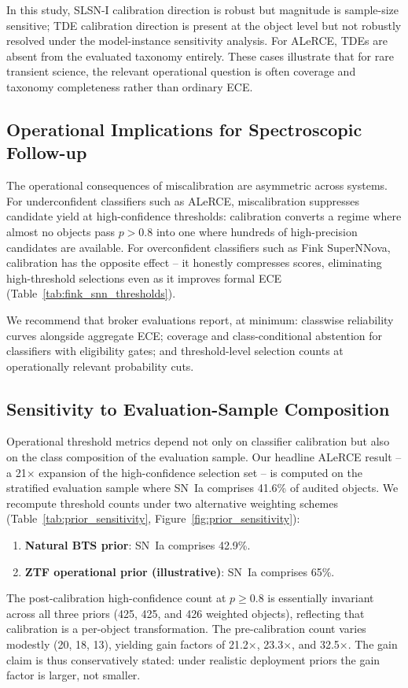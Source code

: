 \documentclass[a4paper,fleqn,usenatbib]{mnras}
\begin{document}
In this study, SLSN-I calibration direction is robust but
magnitude is sample-size sensitive; TDE calibration direction is
present at the object level but not robustly resolved under the
model-instance sensitivity analysis. For ALeRCE, TDEs are absent
from the evaluated taxonomy entirely. These cases illustrate that
for rare transient science, the relevant operational question is
often coverage and taxonomy completeness rather than ordinary ECE.

\subsection{Operational Implications for Spectroscopic
Follow-up}\label{sec:disc_operational}

The operational consequences of miscalibration are asymmetric
across systems. For underconfident classifiers such as ALeRCE,
miscalibration suppresses candidate yield at high-confidence
thresholds: calibration converts a regime where almost no objects
pass $p > 0.8$ into one where hundreds of high-precision candidates
are available. For overconfident classifiers such as Fink
SuperNNova, calibration has the opposite effect -- it honestly
compresses scores, eliminating high-threshold selections even as
it improves formal ECE (Table~\ref{tab:fink_snn_thresholds}).

We recommend that broker evaluations report, at minimum:
classwise reliability curves alongside aggregate ECE; coverage
and class-conditional abstention for classifiers with eligibility
gates; and threshold-level selection counts at operationally
relevant probability cuts.

\subsection{Sensitivity to Evaluation-Sample Composition}
\label{sec:prior_sensitivity}

Operational threshold metrics depend not only on classifier
calibration but also on the class composition of the evaluation
sample. Our headline ALeRCE result -- a 21$\times$ expansion of
the high-confidence selection set -- is computed on the stratified
evaluation sample where SN~Ia comprises 41.6\% of audited objects.
We recompute threshold counts under two alternative weighting
schemes (Table~\ref{tab:prior_sensitivity},
Figure~\ref{fig:prior_sensitivity}):
\begin{enumerate}
\item \textbf{Natural BTS prior}: SN~Ia comprises 42.9\%.
\item \textbf{ZTF operational prior (illustrative)}: SN~Ia
comprises 65\%.
\end{enumerate}
The post-calibration high-confidence count at $p \geq 0.8$ is
essentially invariant across all three priors (425, 425, and 426
weighted objects), reflecting that calibration is a per-object
transformation. The pre-calibration count varies modestly (20, 18,
13), yielding gain factors of 21.2$\times$, 23.3$\times$, and
32.5$\times$. The gain claim is thus conservatively stated: under
realistic deployment priors the gain factor is larger, not smaller.
\end{document}
